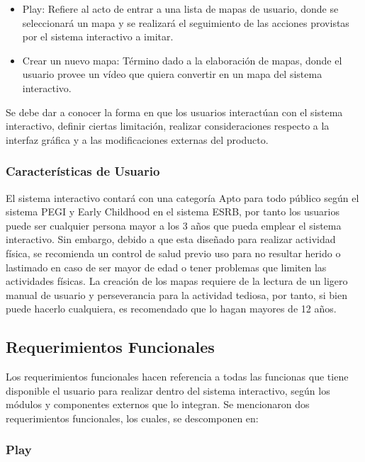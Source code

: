 \begin{itemize}
	\item Play: Refiere al acto de entrar a una lista de mapas de usuario, donde se seleccionará un mapa y se realizará el seguimiento de las acciones provistas por el sistema interactivo a imitar.	
	\item Crear un nuevo mapa: Término dado a la elaboración de mapas, donde el usuario provee un vídeo que quiera convertir en un mapa del sistema interactivo.
\end{itemize}

Se debe dar a conocer la forma en que los usuarios interactúan con el sistema interactivo, definir ciertas limitación, realizar consideraciones respecto a la interfaz gráfica y a las modificaciones externas del producto.

\subsubsection{Características de Usuario}

El sistema interactivo contará con una categoría Apto para todo público según el sistema PEGI y Early Childhood en el sistema ESRB, por tanto los usuarios puede ser cualquier persona mayor a los 3 años que pueda emplear el sistema interactivo. Sin embargo, debido a que esta diseñado para realizar actividad física, se recomienda un control de salud previo uso para no resultar herido o lastimado en caso de ser mayor de edad o tener problemas que limiten las actividades físicas.
La creación de los mapas requiere de la lectura de un ligero manual de usuario y perseverancia para la actividad tediosa, por tanto, si bien puede hacerlo cualquiera, es recomendado que lo hagan mayores de 12 años.


\subsection{Requerimientos Funcionales}

Los requerimientos funcionales hacen referencia a todas las funcionas que tiene disponible el usuario para realizar dentro del sistema interactivo, según los módulos y componentes externos que lo integran. Se mencionaron dos requerimientos funcionales, los cuales, se descomponen en:

\subsubsection{Play}

